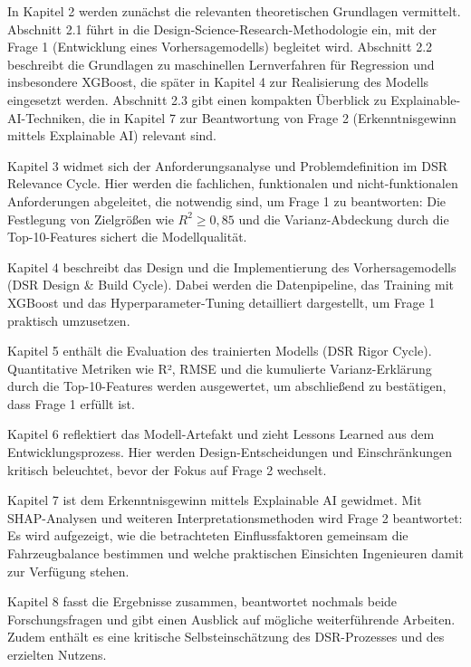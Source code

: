 In Kapitel 2 werden zunächst die relevanten theoretischen Grundlagen vermittelt. Abschnitt 2.1 führt in die Design-Science-Research-Methodologie ein, mit der Frage 1 (Entwicklung eines Vorhersagemodells) begleitet wird. Abschnitt 2.2 beschreibt die Grundlagen zu maschinellen Lernverfahren für Regression und insbesondere XGBoost, die später in Kapitel 4 zur Realisierung des Modells eingesetzt werden. Abschnitt 2.3 gibt einen kompakten Überblick zu Explainable-AI-Techniken, die in Kapitel 7 zur Beantwortung von Frage 2 (Erkenntnisgewinn mittels Explainable AI) relevant sind.

Kapitel 3 widmet sich der Anforderungsanalyse und Problemdefinition im DSR Relevance Cycle. Hier werden die fachlichen, funktionalen und nicht-funktionalen Anforderungen abgeleitet, die notwendig sind, um Frage 1 zu beantworten: Die Festlegung von Zielgrößen wie \(R^2\ge0{,}85\) und die Varianz-Abdeckung durch die Top-10-Features sichert die Modellqualität.

Kapitel 4 beschreibt das Design und die Implementierung des Vorhersagemodells (DSR Design \& Build Cycle). Dabei werden die Datenpipeline, das Training mit XGBoost und das Hyperparameter-Tuning detailliert dargestellt, um Frage 1 praktisch umzusetzen.

Kapitel 5 enthält die Evaluation des trainierten Modells (DSR Rigor Cycle). Quantitative Metriken wie R², RMSE und die kumulierte Varianz-Erklärung durch die Top-10-Features werden ausgewertet, um abschließend zu bestätigen, dass Frage 1 erfüllt ist.

Kapitel 6 reflektiert das Modell-Artefakt und zieht Lessons Learned aus dem Entwicklungsprozess. Hier werden Design-Entscheidungen und Einschränkungen kritisch beleuchtet, bevor der Fokus auf Frage 2 wechselt.

Kapitel 7 ist dem Erkenntnisgewinn mittels Explainable AI gewidmet. Mit SHAP-Analysen und weiteren Interpretationsmethoden wird Frage 2 beantwortet: Es wird aufgezeigt, wie die betrachteten Einflussfaktoren gemeinsam die Fahrzeugbalance bestimmen und welche praktischen Einsichten Ingenieuren damit zur Verfügung stehen.

Kapitel 8 fasst die Ergebnisse zusammen, beantwortet nochmals beide Forschungsfragen und gibt einen Ausblick auf mögliche weiterführende Arbeiten. Zudem enthält es eine kritische Selbsteinschätzung des DSR-Prozesses und des erzielten Nutzens.  
